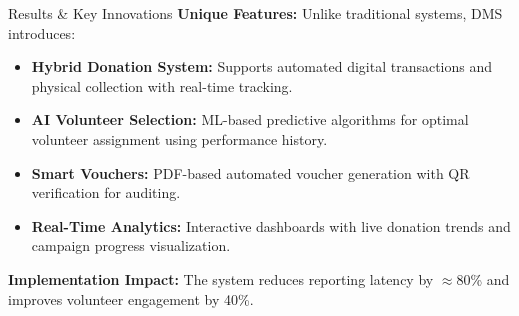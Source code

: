 \documentclass[final,hyperref={pdfpagelabels=false}]{beamer}
\newlength{\onecolwid}
\begin{document}
\begin{frame}[t]
\begin{columns}[t]
\begin{column}{\onecolwid}
\begin{block}{\Large Results \& Key Innovations}
\justify
\large
\textbf{Unique Features:}
Unlike traditional systems, DMS introduces:
\begin{itemize}
    \item \textbf{Hybrid Donation System:} Supports automated digital transactions and physical collection with real-time tracking.
    \item \textbf{AI Volunteer Selection:} ML-based predictive algorithms for optimal volunteer assignment using performance history.
    \item \textbf{Smart Vouchers:} PDF-based automated voucher generation with QR verification for auditing.
    \item \textbf{Real-Time Analytics:} Interactive dashboards with live donation trends and campaign progress visualization.
\end{itemize}

\textbf{Implementation Impact:}
The system reduces reporting latency by $\approx$80\% and improves volunteer engagement by 40\%.

\vskip0.1cm


\end{block}
\end{column}
\end{columns}
\end{frame}
\end{document}
